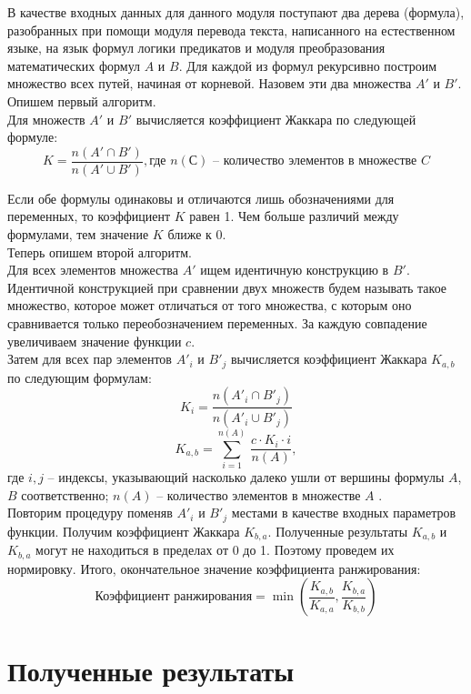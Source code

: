 \documentclass[12pt]{article}
\begin{document}
В качестве входных данных для данного модуля поступают два дерева (формула), разобранных при помощи  модуля перевода текста, написанного на естественном языке, на язык формул логики предикатов и модуля преобразования математических формул $A$ и $B$. Для каждой из формул рекурсивно построим множество всех путей, начиная от корневой. Назовем эти два множества $A'$ и $B'$.\\

Опишем первый алгоритм.  \\

Для множеств $A'$ и $B'$ вычисляется коэффициент Жаккара по следующей формуле: $$K=\dfrac{n(A' \cap B')}{n(A' \cup B')}, \text{где } n(С) \text{ --  количество элементов в множестве } C$$

Если обе формулы одинаковы и отличаются лишь обозначениями для переменных, то коэффициент $K$ равен 1. Чем больше различий между формулами, тем значение $K$ ближе к  $0$.\\

Теперь опишем второй алгоритм. \\

Для всех элементов множества $A'$ ищем идентичную конструкцию в $B'$. Идентичной конструкцией при сравнении двух множеств будем называть такое множество, которое может отличаться от того множества, с которым оно сравнивается только переобозначением переменных. За каждую совпадение увеличиваем значение функции $c$. \\

Затем для всех пар элементов $A'_{i}$ и $B'_{j}$ вычисляется коэффициент Жаккара $K_{a,b}$ по следующим формулам:
$$K_i=\dfrac{n(A'_{i} \cap B'_{j})}{n(A'_{i} \cup B'_{j})} $$
$$K_{a,b}= \sum \limits_{i=1}^{n(A)}\, \dfrac{c\cdot K_i \cdot i}{n(A)},$$  где $i,j$  --  индексы, указывающий насколько далеко ушли от вершины формулы $A$,$B$ соответственно; $n(A)$ -- количество элементов в множестве $A$ . \\

Повторим процедуру поменяв $A'_{i}$ и $B'_{j}$ местами в качестве входных параметров функции. Получим коэффициент Жаккара $K_{b,a}$. Полученные результаты  $K_{a,b}$ и $K_{b,a}$ могут не находиться в пределах от 0 до 1. Поэтому проведем их нормировку. Итого, окончательное значение коэффициента ранжирования:
$$\text{Коэффициент ранжирования}=\min \left (\dfrac{K_{a,b}}{K_{a,a}}, \dfrac{K_{b,a}}{K_{b,b}} \right )$$


\newpage
\section{Полученные результаты}
\end{document}

